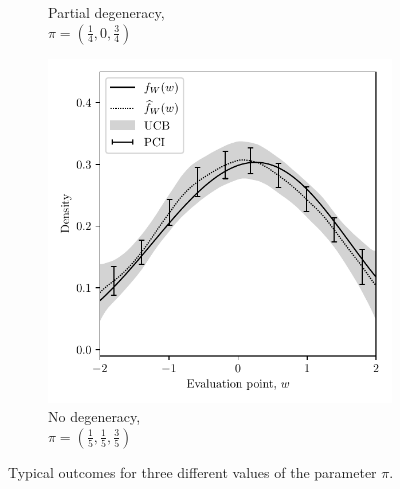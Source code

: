 \begin{figure}[ht]
\begin{subfigure}{0.32\textwidth}
    \caption{
      Partial degeneracy, \\
      $\pi = \left( \frac{1}{4}, 0, \frac{3}{4} \right)$
    }
  \end{subfigure}
  \begin{subfigure}{0.32\textwidth}
    \centering
    \includegraphics[scale=0.48]{graphics/result_none.pdf}
    \caption{
      No degeneracy, \\
      $\pi = \left( \frac{1}{5}, \frac{1}{5}, \frac{3}{5} \right)$
    }
  \end{subfigure}
  \caption{
    Typical outcomes for three different values of the parameter $\pi$.
  }
  \label{fig:results}
  \vspace{-.8em}
\end{figure}

